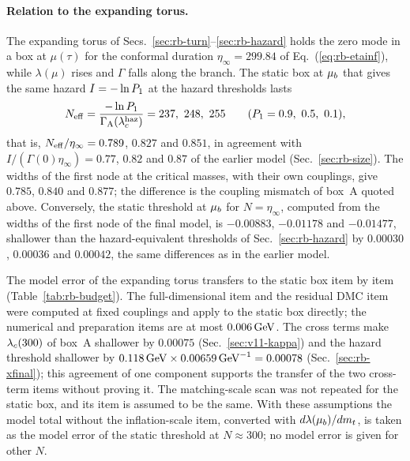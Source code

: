 \paragraph{Relation to the expanding torus.}
The expanding torus of Secs.~\ref{sec:rb-turn}--\ref{sec:rb-hazard} holds the zero mode in a box at $\mu(\tau)$ for the conformal duration $\eta_\infty=299.84$ of Eq.~(\ref{eq:rb-etainf}), while $\lambda(\mu)$ rises and $\Gamma$ falls along the branch. %
The static box at $\mu_b$ that gives the same hazard $I=-\ln P_1$ at the hazard thresholds lasts
\begin{equation}
N_{\rm eff}=\frac{-\ln P_1}{\Gamma_{\rm A}(\lambda_c^{\rm haz})}=237,\ 248,\ 255\qquad(P_1=0.9,\ 0.5,\ 0.1),
\label{eq:v11-Neff}
\end{equation}
that is, $N_{\rm eff}/\eta_\infty=0.789$, $0.827$ and $0.851$, in agreement with $I/(\Gamma(0)\eta_\infty)=0.77$, $0.82$ and $0.87$ of the earlier model (Sec.~\ref{sec:rb-size}). %
The widths of the first node at the critical masses, with their own couplings, give $0.785$, $0.840$ and $0.877$; the difference is the coupling mismatch of box~A quoted above. %
Conversely, the static threshold at $\mu_b$ for $N=\eta_\infty$, computed from the widths of the first node of the final model, is $-0.00883$, $-0.01178$ and $-0.01477$, shallower than the hazard-equivalent thresholds of Sec.~\ref{sec:rb-hazard} by $0.00030$, $0.00036$ and $0.00042$, the same differences as in the earlier model. %

The model error of the expanding torus transfers to the static box item by item (Table~\ref{tab:rb-budget}).
The full-dimensional item and the residual DMC item were computed at fixed couplings and apply to the static box directly; the numerical and preparation items are at most $0.006\,\mathrm{GeV}$. %
The cross terms make $\lambda_c(300)$ of box~A shallower by $0.00075$ (Sec.~\ref{sec:v11-kappa}) and the hazard threshold shallower by $0.118\,\mathrm{GeV}\times0.00659\,\mathrm{GeV}^{-1}=0.00078$ (Sec.~\ref{sec:rb-xfinal}); this agreement of one component supports the transfer of the two cross-term items without proving it. %
The matching-scale scan was not repeated for the static box, and its item is assumed to be the same.
With these assumptions the model total without the inflation-scale item, converted with $d\lambda(\mu_b)/dm_t$, is taken as the model error of the static threshold at $N\approx300$; no model error is given for other $N$.

